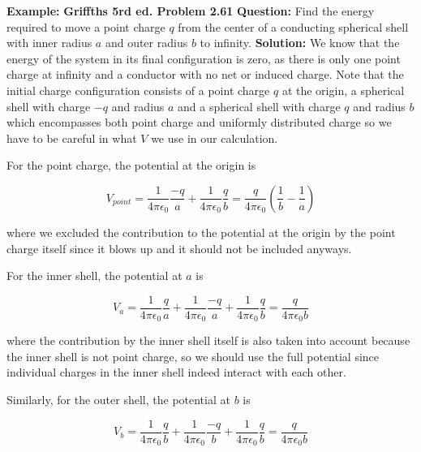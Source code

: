 \documentclass[a4paper,12pt]{report}
\begin{document}
	\begin{example_template}
		\textbf{Example:} \textbf{Griffths 5rd ed. Problem 2.61} \newline \newline
		\textbf{Question:} Find the energy required to move a point charge  \(q\) from the center of a conducting spherical shell with inner radius \(a\) and outer radius \(b\) to infinity.
		\newline \newline
		\textbf{Solution:} We know that the energy of the system in its final configuration is zero, as there is only one point charge at infinity and a conductor with no net or induced charge. Note that the initial charge configuration consists of a point charge \(q\) at the origin, a spherical shell with charge \(-q\) and radius \(a\) and a spherical shell with charge \(q\) and radius \(b\) which encompasses both point charge and uniformly distributed charge so we have to be careful in what \(V\) we use in our calculation.
		
		For the point charge, the potential at the origin is 
		
		\begin{equation}
			V_{point} = \frac{1}{4\pi\epsilon_0} \frac{-q}{a} + \frac{1}{4\pi\epsilon_0} \frac{q}{b}  = \frac{q}{4\pi \epsilon_0} (\frac{1}{b} - \frac{1}{a} )
		\end{equation}
		
		where we excluded the contribution to the potential at the origin by the point charge itself since it blows up and it should not be included anyways.
		
		For the inner shell, the potential at \(a\) is
		
		\begin{equation}
			V_{a} = \frac{1}{4\pi\epsilon_0} \frac{q}{a} + \frac{1}{4\pi\epsilon_0} \frac{-q}{a}  + \frac{1}{4\pi\epsilon_0} \frac{q}{b} = \frac{q}{4\pi \epsilon_0 b} 
		\end{equation}
		
		where the contribution by the inner shell itself is also taken into account because the inner shell is not point charge, so we should use the full potential since individual charges in the inner shell indeed interact with each other.
		
		Similarly, for the outer shell, the potential at \(b\) is
		
		\begin{equation}
			V_{b} = \frac{1}{4\pi\epsilon_0} \frac{q}{b} + \frac{1}{4\pi\epsilon_0} \frac{-q}{b} + \frac{1}{4\pi\epsilon_0} \frac{q}{b}  = \frac{q}{4\pi \epsilon_0 b}   
		\end{equation}
		

\end{example_template}
\end{document}
